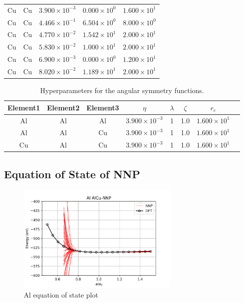 \documentclass{article}
\renewcommand{\arraystretch}{1.5}
\begin{document}
\begin{longtable}{ccccc}
Cu &  Cu & $3.900 \times 10^{-3}$ & $0.000 \times 10^{0}$ & $1.600 \times 10^{1}$ \\
Cu &  Cu & $4.466 \times 10^{-1}$ & $6.504 \times 10^{0}$ & $8.000 \times 10^{0}$ \\
Cu &  Cu & $4.770 \times 10^{-2}$ & $1.542 \times 10^{1}$ & $2.000 \times 10^{1}$ \\
Cu &  Cu & $5.830 \times 10^{-2}$ & $1.000 \times 10^{1}$ & $2.000 \times 10^{1}$ \\
Cu &  Cu & $6.900 \times 10^{-3}$ & $0.000 \times 10^{0}$ & $1.200 \times 10^{1}$ \\
Cu &  Cu & $8.020 \times 10^{-2}$ & $1.189 \times 10^{1}$ & $2.000 \times 10^{1}$ \\
\hline
\end{longtable}
\egroup

\begin{table}[H]
\caption{Hyperparameters for the angular symmetry functions.}
\centering
\vspace{1em}
\bgroup
\def\arraystretch{1.2}
\begin{tabular}{cccccccc}
\hline
Element1 & Element2 & Element3 & $\eta$ & $\lambda$ & $\zeta$ & $r_c$\\
\hline
\hline
Al &  Al &  Al & $3.900 \times 10^{-3}$ &  1 &  1.0 & $1.600 \times 10^{1}$ \\
Al &  Al &  Cu & $3.900 \times 10^{-3}$ &  1 &  1.0 & $1.600 \times 10^{1}$ \\
Cu &  Al &  Cu & $3.900 \times 10^{-3}$ &  1 &  1.0 & $1.600 \times 10^{1}$ \\
\hline
\end{tabular}
\label{table:symfunc_angular_hypers}
\egroup
\end{table}

\subsection{Equation of State of NNP} \label{sct:eos_data}

\begin{figure}[H]%
\centering%
\includegraphics[width=0.7\textwidth,center]{figures/EOS_AlCu-NNP_Al.png}%
\caption{Al equation of state plot}%
\end{figure}
\end{document}
